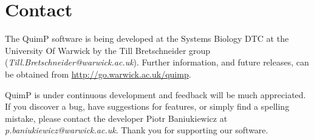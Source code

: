 \documentclass[a4paper,12pt]{article}
\begin{document}
\section{Contact}

The QuimP software is being developed at the Systems Biology DTC at the University Of Warwick by the Till Bretschneider group (\textit{Till.Bretschneider@warwick.ac.uk}).
Further information, and future releases, can be obtained from \url{http://go.warwick.ac.uk/quimp}.

QuimP is under continuous development and feedback will be much appreciated.  If you discover a bug, have suggestions 
for features, or simply find a spelling mistake, please contact the developer Piotr Baniukiewicz at \textit{p.baniukiewicz@warwick.ac.uk}. Thank you for supporting our software. 

 
\end{document}
